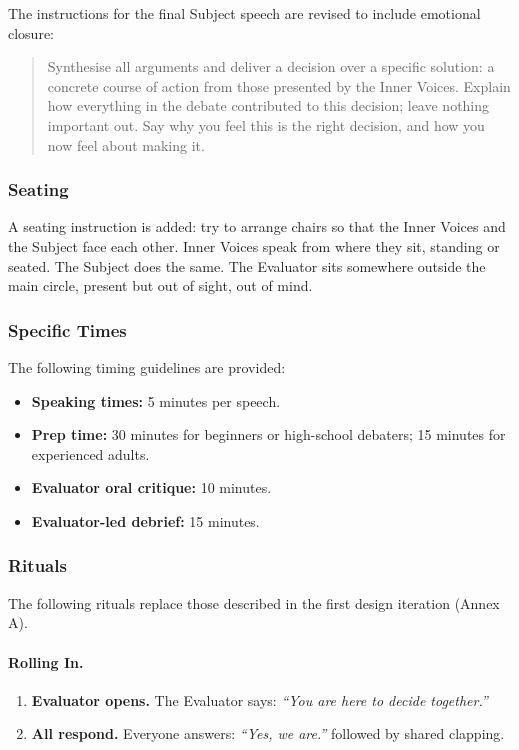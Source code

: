 The instructions for the final Subject speech are revised to include emotional closure:

\begin{quote}
Synthesise all arguments and deliver a decision over a specific solution: a concrete course of action from those presented by the Inner Voices. Explain how everything in the debate contributed to this decision; leave nothing important out. Say why you feel this is the right decision, and how you now feel about making it.
\end{quote}

\subsubsection{Seating}

A seating instruction is added: try to arrange chairs so that the Inner Voices and the Subject face each other. Inner Voices speak from where they sit, standing or seated. The Subject does the same. The Evaluator sits somewhere outside the main circle, present but out of sight, out of mind.

\subsubsection{Specific Times}

The following timing guidelines are provided:

\begin{itemize}
    \item \textbf{Speaking times:} 5 minutes per speech.
    \item \textbf{Prep time:} 30 minutes for beginners or high-school debaters; 15 minutes for experienced adults.
    \item \textbf{Evaluator oral critique:} 10 minutes.
    \item \textbf{Evaluator-led debrief:} 15 minutes.
\end{itemize}

\subsubsection{Rituals}

The following rituals replace those described in the first design iteration (Annex A).

\paragraph{Rolling In.}
\begin{enumerate}
    \item \textbf{Evaluator opens.} The Evaluator says: \textit{``You are here to decide together.''}
    \item \textbf{All respond.} Everyone answers: \textit{``Yes, we are.''} followed by shared clapping.
\end{enumerate}

